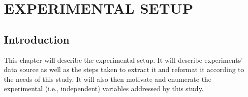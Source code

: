 \chapter{EXPERIMENTAL SETUP}


%

\section{Introduction}
This chapter will describe the experimental setup. It will describe experiments' data source as well as the steps taken to extract it and reformat it according to the needs of this study. It will also then motivate and enumerate the experimental (i.e., independent) variables addressed by this study.

